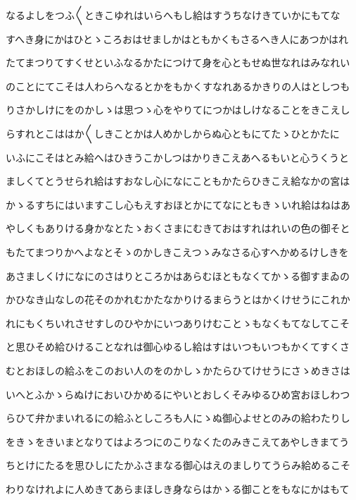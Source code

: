 \documentclass[a4paper,11pt,landscape]{ltjtarticle}
\begin{document}
なるよしをつふ〱ときこゆれはいらへもし給はすうちなけきていかにもてな
\par\medskip
すへき身にかはひとゝころおはせましかはともかくもさるへき人にあつかはれ
\par\medskip
たてまつりてすくせといふなるかたにつけて身を心ともせぬ世なれはみなれい
\par\medskip
のことにてこそは人わらへなるとかをもかくすなれあるかきりの人はとしつも
\par\medskip
りさかしけにをのかしゝは思つゝ心をやりてにつかはしけなることをきこえし
\par\medskip
らすれとこははか〱しきことかは人めかしからぬ心ともにてたゝひとかたに
\par\medskip
いふにこそはとみ給へはひきうこかしつはかりきこえあへるもいと心うくうと
\par\medskip
ましくてとうせられ給はすおなし心になにこともかたらひきこえ給なかの宮は
\par\medskip
かゝるすちにはいますこし心もえすおほとかにてなにともきゝいれ給はねはあ
\par\medskip
やしくもありける身かなとたゝおくさまにむきておはすれはれいの色の御そと
\par\medskip
もたてまつりかへよなとそゝのかしきこえつゝみなさる心すへかめるけしきを
\par\medskip
あさましくけになにのさはりところかはあらむほともなくてかゝる御すまゐの
\par\medskip
かひなき山なしの花そのかれむかたなかりけるまらうとはかくけせうにこれか
\par\medskip
れにもくちいれさせすしのひやかにいつありけむことゝもなくもてなしてこそ
\par\medskip
と思ひそめ給ひけることなれは御心ゆるし給はすはいつもいつもかくてすくさ
\par\medskip
むとおほしの給ふをこのおい人のをのかしゝかたらひてけせうにさゝめきさは
\par\medskip
いへとふかゝらぬけにおいひかめるにやいとおしくそみゆるひめ宮おほしわつ
\par\medskip
らひて弁かまいれるにの給ふとしころも人にゝぬ御心よせとのみの給わたりし
\par\medskip
をきゝをきいまとなりてはよろつにのこりなくたのみきこえてあやしきまてう
\par\medskip
ちとけにたるを思ひしにたかふさまなる御心はえのましりてうらみ給めるこそ
\par\medskip
わりなけれよに人めきてあらまほしき身ならはかゝる御ことをもなにかはもて
\par\medskip
\end{document}
